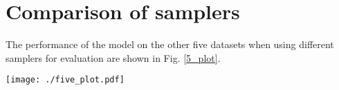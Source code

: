 \section{Comparison of samplers}\label{cp_s}
The performance of the model on the other five datasets when using different samplers for evaluation are shown in Fig. \ref{5_plot}.
\begin{figure*}[t]
	\centering
	\texttt{[image: ./five\_plot.pdf]} 
	\caption{Comparison of samplers on the other five datasets. } %
	\label{5_plot}
\end{figure*}

\ifCLASSOPTIONcaptionsoff
  \newpage
\fi

